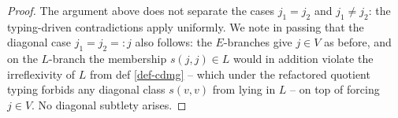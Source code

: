 \documentclass[main]{subfiles}
\begin{document}
\begin{proof}
The argument above does not separate the cases $j_1 = j_2$ and $j_1 \neq j_2$: the typing-driven contradictions apply uniformly. We note in passing that the diagonal case $j_1 = j_2 =: j$ also follows: the $E$-branches give $j \in V$ as before, and on the $L$-branch the membership $s(j, j) \in L$ would in addition violate the irreflexivity of $L$ from def \ref{def-cdmg} -- which under the refactored quotient typing forbids any diagonal class $s(v, v)$ from lying in $L$ -- on top of forcing $j \in V$. No diagonal subtlety arises.
\end{proof}
\end{document}
